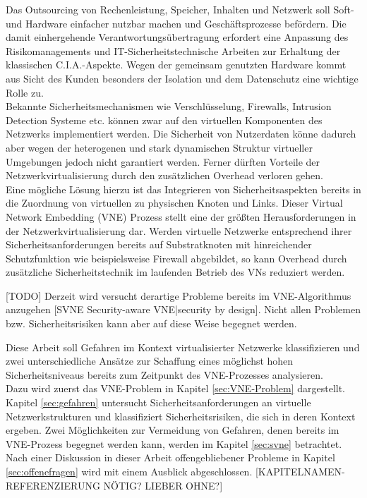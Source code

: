 Das Outsourcing von Rechenleistung, Speicher, Inhalten und Netzwerk soll Soft- und Hardware einfacher nutzbar machen und Geschäftsprozesse befördern. Die damit einhergehende Verantwortungsübertragung erfordert eine Anpassung des Risikomanagements und IT-Sicherheitstechnische Arbeiten zur Erhaltung der klassischen C.I.A.-Aspekte. Wegen der gemeinsam genutzten Hardware kommt aus Sicht des Kunden besonders der Isolation und dem Datenschutz eine wichtige Rolle zu.\\
Bekannte Sicherheitsmechanismen wie Verschlüsselung, Firewalls, Intrusion Detection Systeme etc. können zwar auf den virtuellen Komponenten des Netzwerks implementiert werden. Die Sicherheit von Nutzerdaten könne dadurch aber wegen der heterogenen und stark dynamischen Struktur virtueller Umgebungen jedoch nicht garantiert werden. Ferner dürften Vorteile der Netzwerkvirtualisierung durch den zusätzlichen Overhead verloren gehen. \cite{gong2016virtual}\\
Eine mögliche Lösung hierzu ist das Integrieren von Sicherheitsaspekten bereits in die Zuordnung von virtuellen zu physischen Knoten und Links. Dieser Virtual Network Embedding (VNE) Prozess stellt eine der größten Herausforderungen in der Netzwerkvirtualisierung dar. \cite{fischer2013virtual}
Werden virtuelle Netzwerke entsprechend ihrer Sicherheitsanforderungen bereits auf Substratknoten mit hinreichender Schutzfunktion wie beispielsweise Firewall abgebildet, so kann Overhead durch zusätzliche Sicherheitstechnik im laufenden Betrieb des VNs reduziert werden.

[TODO]
Derzeit wird versucht \cite{bays2012security, gong2016virtual, wang2016towards} derartige Probleme bereits im VNE-Algorithmus anzugehen [SVNE Security-aware VNE|security by design]. Nicht allen Problemen bzw. Sicherheitsrisiken kann aber auf diese Weise begegnet werden. %


Diese Arbeit soll Gefahren im Kontext virtualisierter Netzwerke klassifizieren und zwei unterschiedliche Ansätze zur Schaffung eines möglichst hohen Sicherheitsniveaus bereits zum Zeitpunkt des VNE-Prozesses analysieren.\\
Dazu wird zuerst das VNE-Problem in Kapitel \ref{sec:VNE-Problem} \textit{} dargestellt. Kapitel \ref{sec:gefahren} \textit{} untersucht Sicherheitsanforderungen an virtuelle Netzwerkstrukturen und klassifiziert Sicherheitsrisiken, die sich in deren Kontext ergeben. Zwei Möglichkeiten zur Vermeidung von Gefahren, denen bereits im VNE-Prozess begegnet werden kann, werden im Kapitel \ref{sec:svne} \textit{} betrachtet. Nach einer Diskussion in dieser Arbeit offengebliebener Probleme in Kapitel \ref{sec:offenefragen} \textit{} wird mit einem Ausblick abgeschlossen.
[KAPITELNAMEN-REFERENZIERUNG NÖTIG? LIEBER OHNE?]